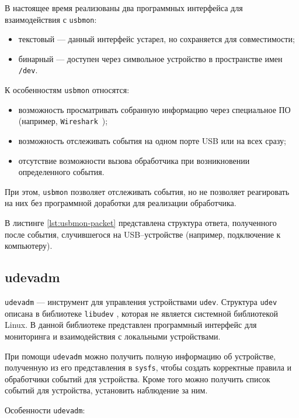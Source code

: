 В настоящее время реализованы два программных интерфейса для взаимодействия с \texttt{usbmon}: 
\begin{itemize}
    \item текстовый --- данный интерфейс устарел, но сохраняется для совместимости;
    \item бинарный --- доступен через символьное устройство в пространстве имен \texttt{/dev}.
\end{itemize}

К особенностям \texttt{usbmon} относятся:

\begin{itemize}
	\item возможность просматривать собранную информацию через специальное ПО (например, \texttt{Wireshark}~\cite{wireshark});
	\item возможность отслеживать события на одном порте USB или на всех сразу;
	\item отсутствие возможности вызова обработчика при возникновении определенного события.
\end{itemize}

При этом, \texttt{usbmon} позволяет отслеживать события, но не позволяет реагировать на них без программной доработки для реализации обработчика.

В листинге \ref{lst:usbmon-packet} представлена структура ответа, полученного после события, случившегося на USB--устройстве (например, подключение к компьютеру).


\subsection{udevadm}

\texttt{udevadm} \cite{udevadm} --- инструмент для управления устройствами \texttt{udev}. Структура \texttt{udev} описана в библиотеке \texttt{libudev} \cite{libudev}, которая не является системной библиотекой Linux. В данной библиотеке представлен программный интерфейс для мониторинга и взаимодействия с локальными устройствами.

При помощи \texttt{udevadm} можно получить полную информацию об устройстве, полученную из его представления в \texttt{sysfs}, чтобы создать корректные правила и обработчики событий для устройства. Кроме того можно получить список событий для устройства, установить наблюдение за ним.

Особенности \texttt{udevadm}:

